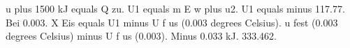 u plus 1500 kJ equals Q zu. U1 equals m E w plus u2. U1 equals minus 117.77. Bei 0.003. X Eis equals U1 minus U f us (0.003 degrees Celsius). u fest (0.003 degrees Celsius) minus U f us (0.003). Minus 0.033 kJ. 333.462.
